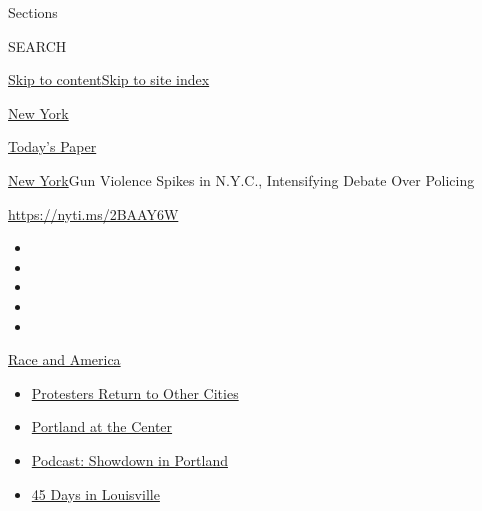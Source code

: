Sections

SEARCH

\protect\hyperlink{site-content}{Skip to
content}\protect\hyperlink{site-index}{Skip to site index}

\href{https://www.nytimes3xbfgragh.onion/section/nyregion}{New York}

\href{https://myaccount.nytimes3xbfgragh.onion/auth/login?response_type=cookie\&client_id=vi}{}

\href{https://www.nytimes3xbfgragh.onion/section/todayspaper}{Today's
Paper}

\href{/section/nyregion}{New York}\textbar{}Gun Violence Spikes in
N.Y.C., Intensifying Debate Over Policing

\url{https://nyti.ms/2BAAY6W}

\begin{itemize}
\item
\item
\item
\item
\item
\end{itemize}

\href{https://www.nytimes3xbfgragh.onion/news-event/george-floyd-protests-minneapolis-new-york-los-angeles?action=click\&pgtype=Article\&state=default\&region=TOP_BANNER\&context=storylines_menu}{Race
and America}

\begin{itemize}
\tightlist
\item
  \href{https://www.nytimes3xbfgragh.onion/2020/07/26/us/protests-portland-seattle-trump.html?action=click\&pgtype=Article\&state=default\&region=TOP_BANNER\&context=storylines_menu}{Protesters
  Return to Other Cities}
\item
  \href{https://www.nytimes3xbfgragh.onion/2020/07/24/us/portland-oregon-protests-white-race.html?action=click\&pgtype=Article\&state=default\&region=TOP_BANNER\&context=storylines_menu}{Portland
  at the Center}
\item
  \href{https://www.nytimes3xbfgragh.onion/2020/07/23/podcasts/the-daily/portland-protests.html?action=click\&pgtype=Article\&state=default\&region=TOP_BANNER\&context=storylines_menu}{Podcast:
  Showdown in Portland}
\item
  \href{https://www.nytimes3xbfgragh.onion/interactive/2020/07/16/us/black-lives-matter-protests-louisville-breonna-taylor.html?action=click\&pgtype=Article\&state=default\&region=TOP_BANNER\&context=storylines_menu}{45
  Days in Louisville}
\end{itemize}

